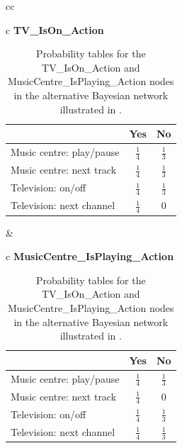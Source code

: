 \begin{table}[h!]
\centering
\caption{Probability tables for the TV\_IsOn\_Action and MusicCentre\_IsPlaying\_Action nodes in the alternative Bayesian network illustrated in .}
\label{tbl:design:bayesian-network:alternative-system-state}
\begin{tabular}{cc}
\begin{tabular}{c}
\textbf{TV\_IsOn\_Action}   \\
\begin{tabular}{l|cc}
~ & Yes   & No \\ \hline
Music centre: play/pause & $\frac{1}{4}$ & $\frac{1}{3}$ \\
Music centre: next track & $\frac{1}{4}$ & $\frac{1}{3}$ \\
Television: on/off       & $\frac{1}{4}$ & $\frac{1}{3}$ \\
Television: next channel & $\frac{1}{4}$ & 0
\end{tabular}
\end{tabular}
&
\begin{tabular}{c}
\textbf{MusicCentre\_IsPlaying\_Action}   \\
\begin{tabular}{l|cc}
~ & Yes   & No \\ \hline
Music centre: play/pause & $\frac{1}{4}$ & $\frac{1}{3}$ \\
Music centre: next track & $\frac{1}{4}$ & 0 \\
Television: on/off       & $\frac{1}{4}$ & $\frac{1}{3}$ \\
Television: next channel & $\frac{1}{4}$ & $\frac{1}{3}$
\end{tabular}
\end{tabular}
\end{tabular}
\end{table}

